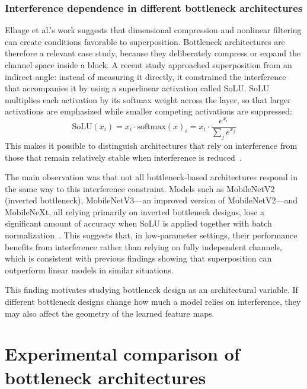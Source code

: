\documentclass[12pt,a4paper]{report}
\begin{document}
\subsection{Interference dependence in different bottleneck architectures}
Elhage et al.'s work suggests that dimensional compression and nonlinear filtering can create conditions favorable to superposition. Bottleneck architectures are therefore a relevant case study, because they deliberately compress or expand the channel space inside a block. A recent study approached superposition from an indirect angle: instead of measuring it directly, it constrained the interference that accompanies it by using a superlinear activation called SoLU. SoLU multiplies each activation by its softmax weight across the layer, so that larger activations are emphasized while smaller competing activations are suppressed:
$$\mathrm{SoLU}(x_i)=x_i \cdot \mathrm{softmax}(x)_i = x_i \cdot \frac{e^{x_i}}{\sum_j e^{x_j}}$$
This makes it possible to distinguish architectures that rely on interference from those that remain relatively stable when interference is reduced~\cite{hollard2025}.

The main observation was that not all bottleneck-based architectures respond in the same way to this interference constraint. Models such as MobileNetV2 (inverted bottleneck), MobileNetV3---an improved version of MobileNetV2---and MobileNeXt, all relying primarily on inverted bottleneck designs, lose a significant amount of accuracy when SoLU is applied together with batch normalization~\cite{hollard2025}. This suggests that, in low-parameter settings, their performance benefits from interference rather than relying on fully independent channels, which is consistent with previous findings showing that superposition can outperform linear models in similar situations\cite{elhage2022}.

This finding motivates studying bottleneck design as an architectural variable. If different bottleneck designs change how much a model relies on interference, they may also affect the geometry of the learned feature maps.

\clearpage

\chapter{Experimental comparison of bottleneck architectures}
\end{document}
